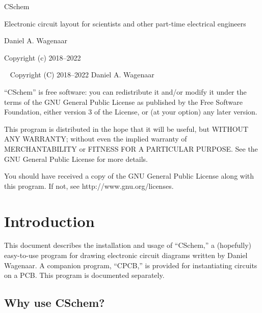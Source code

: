 \documentclass[11pt]{report}
\begin{document}
\thispagestyle{empty}
\begin{centering}
  {\Huge CSchem}
  \vskip30pt

  {\large Electronic circuit layout for scientists and other part-time electrical engineers}
  \vskip60pt

  {\large Daniel A. Wagenaar}
  \vfill
  
  {Copyright (c) 2018--2022}
  
\end{centering}
\pagebreak
~
\vfill
\noindent Copyright (C) 2018--2022 Daniel A. Wagenaar\medskip

``CSchem'' is free software: you can redistribute it and/or modify
it under the terms of the GNU General Public License as published by
the Free Software Foundation, either version 3 of the License, or
(at your option) any later version.

This program is distributed in the hope that it will be useful,
but WITHOUT ANY WARRANTY; without even the implied warranty of
MERCHANTABILITY or FITNESS FOR A PARTICULAR PURPOSE.  See the
GNU General Public License for more details.

You should have received a copy of the GNU General Public License
along with this program.  If not, see http://www.gnu.org/licenses.
\pagebreak

\chapter{Introduction}

This document describes the installation and usage of ``CSchem,'' a
(hopefully) easy-to-use program for drawing electronic circuit
diagrams written by Daniel Wagenaar. A companion program, ``CPCB,''
is provided for instantiating circuits on a PCB. This program is
documented separately.

\section{Why use CSchem?}
\end{document}
